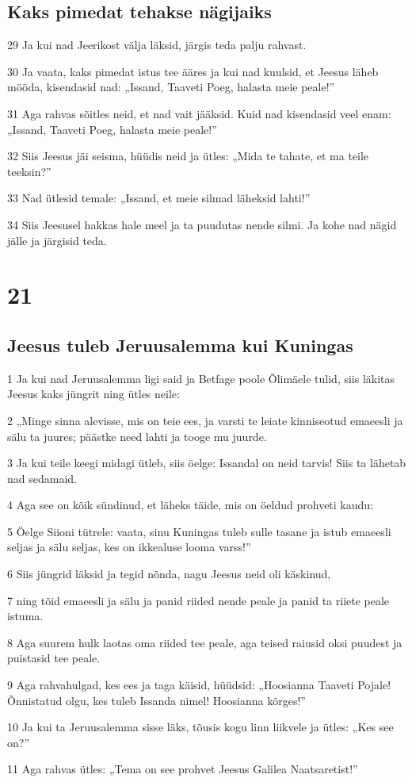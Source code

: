 \section*{Kaks pimedat tehakse nägijaiks}

\par 29 Ja kui nad Jeerikost välja läksid, järgis teda palju rahvast.
\par 30 Ja vaata, kaks pimedat istus tee ääres ja kui nad kuulsid, et Jeesus läheb mööda, kisendasid nad: „Issand, Taaveti Poeg, halasta meie peale!”
\par 31 Aga rahvas sõitles neid, et nad vait jääksid. Kuid nad kisendasid veel enam: „Issand, Taaveti Poeg, halasta meie peale!”
\par 32 Siis Jeesus jäi seisma, hüüdis neid ja ütles: „Mida te tahate, et ma teile teeksin?”
\par 33 Nad ütlesid temale: „Issand, et meie silmad läheksid lahti!”
\par 34 Siis Jeesusel hakkas hale meel ja ta puudutas nende silmi. Ja kohe nad nägid jälle ja järgisid teda.


\chapter{21}

\section*{Jeesus tuleb Jeruusalemma kui Kuningas}


\par 1 Ja kui nad Jeruusalemma ligi said ja Betfage poole Õlimäele tulid, siis läkitas Jeesus kaks jüngrit ning ütles neile:
\par 2 „Minge sinna alevisse, mis on teie ees, ja varsti te leiate kinniseotud emaeesli ja sälu ta juures; päästke need lahti ja tooge mu juurde.
\par 3 Ja kui teile keegi midagi ütleb, siis öelge: Issandal on neid tarvis! Siis ta lähetab nad sedamaid.
\par 4 Aga see on kõik sündinud, et läheks täide, mis on öeldud prohveti kaudu:
\par 5 Öelge Siioni tütrele: vaata, sinu Kuningas tuleb sulle tasane ja istub emaeesli seljas ja sälu seljas, kes on ikkealuse looma varss!”
\par 6 Siis jüngrid läksid ja tegid nõnda, nagu Jeesus neid oli käskinud,
\par 7 ning tõid emaeesli ja sälu ja panid riided nende peale ja panid ta riiete peale istuma.
\par 8 Aga suurem hulk laotas oma riided tee peale, aga teised raiusid oksi puudest ja puistasid tee peale.
\par 9 Aga rahvahulgad, kes ees ja taga käisid, hüüdsid: „Hoosianna Taaveti Pojale! Õnnistatud olgu, kes tuleb Issanda nimel! Hoosianna kõrges!”
\par 10 Ja kui ta Jeruusalemma sisse läks, tõusis kogu linn liikvele ja ütles: „Kes see on?”
\par 11 Aga rahvas ütles: „Tema on see prohvet Jeesus Galilea Naatsaretist!”

